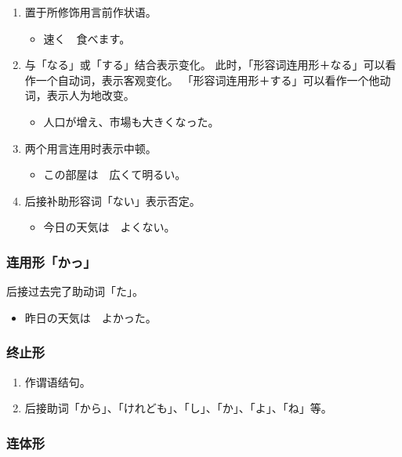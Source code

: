 \begin{enumerate}
  \item 置于所修饰用言前作状语。
    \begin{itemize}
      \item 速く　食べます。
    \end{itemize}
  \item 与「なる」或「する」结合表示变化。
    此时，「形容词连用形＋なる」可以看作一个自动词，表示客观变化。
    「形容词连用形＋する」可以看作一个他动词，表示人为地改变。
    \begin{itemize}
      \item 人口が增え、市場も大きくなった。
    \end{itemize}
  \item 两个用言连用时表示中顿。
    \begin{itemize}
      \item この部屋は　広くて明るい。
    \end{itemize}
  \item 后接补助形容词「ない」表示否定。
    \begin{itemize}
      \item 今日の天気は　よくない。
    \end{itemize}
\end{enumerate}


\subsubsection{连用形「かっ」}%

后接过去完了助动词「た」。
\begin{itemize}
  \item 昨日の天気は　よかった。
\end{itemize}


\subsubsection{终止形}%

\begin{enumerate}
  \item 作谓语结句。
  \item 后接助词「から」、「けれども」、「し」、「か」、「よ」、「ね」等。
\end{enumerate}


\subsubsection{连体形}%


